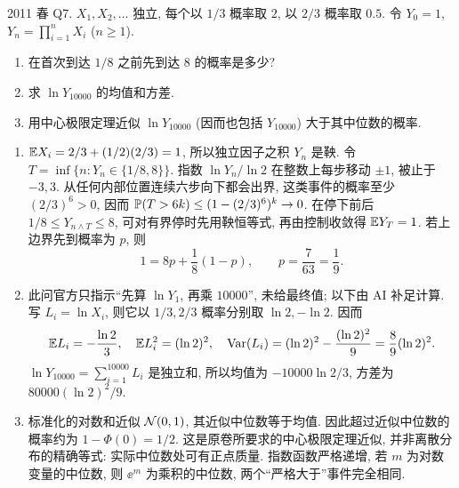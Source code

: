 \begin{exercise}\label{ex:fe2011q7}
2011 春 Q7. $X_1,X_2,\ldots$ 独立, 每个以 $1/3$ 概率取 $2$, 以 $2/3$ 概率取 $0.5$. 令 $Y_0=1$, $Y_n=\prod_{i=1}^nX_i$ ($n\ge1$).
\begin{enumerate}[label=(\alph*)]
\item\label{ex:fe2011q7-a} 在首次到达 $1/8$ 之前先到达 $8$ 的概率是多少?
\item\label{ex:fe2011q7-b} 求 $\ln Y_{10000}$ 的均值和方差.
\item\label{ex:fe2011q7-c} 用中心极限定理近似 $\ln Y_{10000}$ (因而也包括 $Y_{10000}$) 大于其中位数的概率.
\end{enumerate}
\end{exercise}
\begin{solution}
\begin{enumerate}[label=(\alph*)]
\item\label{sol:fe2011q7-a} $\mathbb E X_i=2/3+(1/2)(2/3)=1$, 所以独立因子之积 $Y_n$ 是鞅. 令 $T=\inf\{n:Y_n\in\{1/8,8\}\}$. 指数 $\ln Y_n/\ln2$ 在整数上每步移动 $\pm1$, 被止于 $-3,3$. 从任何内部位置连续六步向下都会出界, 这类事件的概率至少 $(2/3)^6>0$, 因而 $\mathbb P(T>6k)\le(1-(2/3)^6)^k\to0$. 在停下前后 $1/8\le Y_{n\wedge T}\le8$, 可对有界停时先用鞅恒等式, 再由控制收敛得 $\mathbb E Y_T=1$. 若上边界先到概率为 $p$, 则
\[
 1=8p+\frac18(1-p),\qquad p=\frac{7}{63}=\frac19.
\]
\item\label{sol:fe2011q7-b} 此问官方只指示“先算 $\ln Y_1$, 再乘 $10000$”, 未给最终值; 以下由 AI 补足计算. 写 $L_i=\ln X_i$, 则它以 $1/3,2/3$ 概率分别取 $\ln2,-\ln2$. 因而
\[
 \mathbb E L_i=-\frac{\ln2}{3},\quad \mathbb E L_i^2=(\ln2)^2,\quad
 \operatorname{Var}(L_i)=(\ln2)^2-\frac{(\ln2)^2}{9}=\frac89(\ln2)^2.
\]
$\ln Y_{10000}=\sum_{i=1}^{10000}L_i$ 是独立和, 所以均值为 $-10000\ln2/3$, 方差为 $80000(\ln2)^2/9$.
\item\label{sol:fe2011q7-c} 标准化的对数和近似 $\mathcal N(0,1)$, 其近似中位数等于均值. 因此超过近似中位数的概率约为 $1-\Phi(0)=1/2$. 这是原卷所要求的中心极限定理近似, 并非离散分布的精确等式: 实际中位数处可有正点质量. 指数函数严格递增, 若 $m$ 为对数变量的中位数, 则 $\ee^m$ 为乘积的中位数, 两个“严格大于”事件完全相同.
\end{enumerate}
\end{solution}

